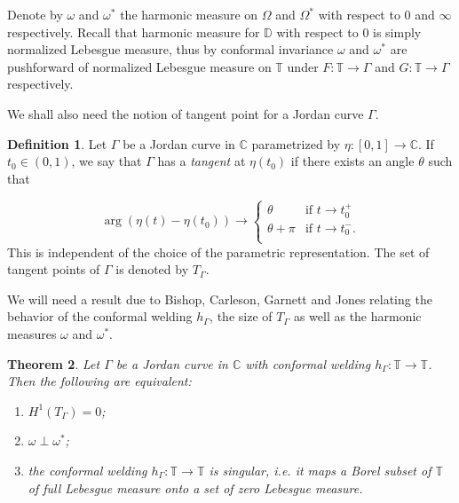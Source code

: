 \documentclass{amsart}
\theoremstyle{plain}
\newtheorem{theorem}{Theorem}[section]
\theoremstyle{definition}
\newtheorem{definition}[theorem]{Definition}
\theoremstyle{remark}
\newcommand{\mC}{\mathbb{C}}
\newcommand{\mD}{\mathbb{D}}
\newcommand{\mT}{\mathbb{T}}
\begin{document}
Denote by $\omega$ and $\omega^*$ the harmonic measure on $\Omega$ and $\Omega^*$ with respect to $0$ and $\infty$ respectively. Recall that harmonic measure for $\mD$ with respect to $0$ is simply normalized Lebesgue measure, thus by conformal invariance $\omega$ and $\omega^*$ are pushforward of normalized Lebesgue measure on $\mT$ under $F:\mT \to \Gamma$ and $G:\mT \to \Gamma$ respectively.

We shall also need the notion of tangent point for a Jordan curve $\Gamma$.

\begin{definition}
Let $\Gamma$ be a Jordan curve in $\mC$ parametrized by $\eta:[0,1] \to \mC$. If $t_0 \in (0,1)$, we say that $\Gamma$ has a \textit{tangent} at $\eta(t_0)$ if there exists an angle $\theta$ such that

\begin{displaymath}
\arg{(\eta(t)-\eta(t_0))} \to \left\{ \begin{array}{ll}
\theta & \textrm{if $t \to t_0^+ $}\\
\theta+\pi & \textrm{if $t \to t_0^-$}.\\
\end{array} \right.
\end{displaymath}
This is independent of the choice of the parametric representation. The set of tangent points of $\Gamma$ is denoted by $T_\Gamma$.
\end{definition}

We will need a result due to Bishop, Carleson, Garnett and Jones relating the behavior of the conformal welding $h_\Gamma$, the size of $T_\Gamma$ as well as the harmonic measures $\omega$ and $\omega^*$.

\begin{theorem}
\label{theorem:singular}
Let $\Gamma$ be a Jordan curve in $\mC$ with conformal welding $h_\Gamma: \mT \to \mT$. Then the following are equivalent:

\begin{enumerate}[\normalfont(i)]
\item $H^1(T_\Gamma)=0$;
\item $\omega \perp \omega^*$;
\item the conformal welding $h_\Gamma: \mT \to \mT$ is singular, i.e. it maps a Borel subset of $\mT$ of full Lebesgue measure onto a set of zero Lebesgue measure.

\end{enumerate}

\end{theorem}
\end{document}
